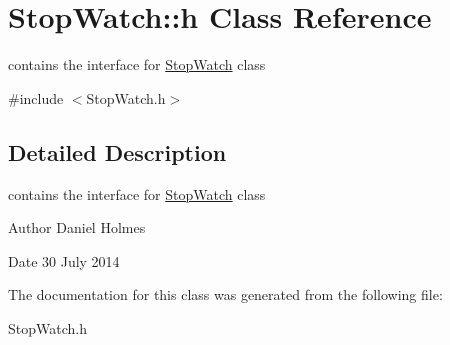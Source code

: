 \hypertarget{class_stop_watch_1_1h}{\section{Stop\+Watch\+:\+:h Class Reference}
\label{class_stop_watch_1_1h}
}


contains the interface for \hyperlink{class_stop_watch}{Stop\+Watch} class  




{\ttfamily \#include $<$Stop\+Watch.\+h$>$}



\subsection{Detailed Description}
contains the interface for \hyperlink{class_stop_watch}{Stop\+Watch} class 

\begin{DoxyAuthor}{Author}
Daniel Holmes 
\end{DoxyAuthor}
\begin{DoxyDate}{Date}
30 July 2014 
\end{DoxyDate}


The documentation for this class was generated from the following file\+:\begin{DoxyCompactItemize}
\item 
Stop\+Watch.\+h\end{DoxyCompactItemize}
